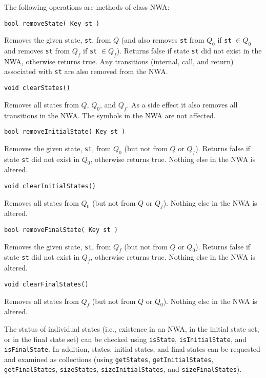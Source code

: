 \noindent The following operations are methods of class NWA:

\begin{description}

  \item\texttt{bool removeState( Key st )} \nopagebreak

    Removes the given state, \texttt{st}, from $Q$ (and also removes
    \texttt{st} from $Q_0$ if \texttt{st} $\in Q_0$ and removes \texttt{st}
    from $Q_f$ if \texttt{st} $\in Q_f$).  Returns false if state \texttt{st}
    did not exist in the NWA, otherwise returns true. 
    Any transitions (internal, call, and return)
    associated with \texttt{st} are also removed from the NWA.

  \item\texttt{void clearStates()} \nopagebreak

    Removes all states from $Q$, $Q_0$, and
    $Q_f$.  As a side effect it also removes all transitions in the NWA.  The
    symbols in the NWA are not affected.

  \item\texttt{bool removeInitialState( Key st )} \nopagebreak

    Removes the given state, \texttt{st}, from $Q_0$ (but not from $Q$ or
    $Q_f$).  Returns false if state \texttt{st} did not exist in $Q_0$,
    otherwise returns true.  Nothing else in the NWA is altered.

  \item\texttt{void clearInitialStates()} \nopagebreak

    Removes all states from $Q_0$ (but not from $Q$ or $Q_f$).  Nothing else
    in the NWA is altered.

  \item\texttt{bool removeFinalState( Key st )} \nopagebreak

    Removes the given state, \texttt{st}, from $Q_f$ (but not from $Q$ or
    $Q_0$).  Returns false if state \texttt{st} did not exist in $Q_f$,
    otherwise returns true.  Nothing else in the NWA is altered.

  \item\texttt{void clearFinalStates()} \nopagebreak

    Removes all states from $Q_f$ (but not from $Q$ or $Q_0$).  Nothing else
    in the NWA is altered. \\

\end{description}

The status of individual states (i.e., existence in an NWA, in the initial
state set, or in the final state set) can be checked
using \texttt{isState},
\texttt{isInitialState}, and \texttt{isFinalState}.  In addition, states,
initial states, and final states can be requested and examined as collections
(using \texttt{getStates}, \texttt{getInitialStates},
\texttt{getFinalStates}, \texttt{sizeStates},
\texttt{sizeInitialStates}, and \texttt{sizeFinalStates}). \\

